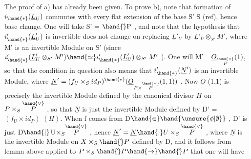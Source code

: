 The proof of a) has already been given. To prove b), note
that formation of $i_{\hand{*}}(\underline{L}_U)$ commutes with every flat extension of the
base S' \quad S (ref), hence  
  base change. One
will take S' = $\hand{\check{}}\mathrm{P}$ , and note that the hypothesis that $i'_{\hand{*}}(\underline{L}'_U)$ is invertible does not
change on replacing $\underline{L}'_U$ by $\underline{L}'_U\otimes_{S'}M'$, where M' is an invertible Module
on S' (since $i'_{\hand{*}}(\underline{L}'_U\otimes_{S'}M')\hand{\simeq} i'_{\hand{*}}(\underline{L}'_U)\otimes_{S'}M'$ ). One will  M'= $\underline{O}_{\overset{\hand{\vee}}{P}}(1)$, so
that the condition in question also means that $i'_{\hand{*}}(\underline{N}')$ is an invertible
Module, where $\underline{N}'= (f_U\times_S id_P)^{\hand{*}}(\underline{O}_{P\times\overset{\hand{\vee}}{P}}(1,1))$ . Now $\underline{O}$ (1,1) is precisely
the invertible Module defined by the canonical divisor $\underline{H}$ on $P\times_S\overset{\hand{\vee}}{P}$ , so
that $\underline{N}$ is just the invertible Module defined by \qquad D' =
$(f_U\times id_P)$ $(\underline{H})$.  When f comes from D$\hand{\in}\hand{\unsure{\phi|\emptyset}}$ , 
D' is just D$\hand{|}$U$\times_S\overset{\hand{\vee}}{P}$ ,  hence $\underline{N}' = \underline{N}\hand{|}U\times_S\overset{\hand{\vee}}{P}$ ,
where $\underline{N}$ is the invertible Module on $X\times_S\hand{\check{}}P$ defined by D, and it follows
from lemma  above  applied to $P\times_S\hand{\check{}}P\hand{\to}\hand{\check{}}P$ that one will have
